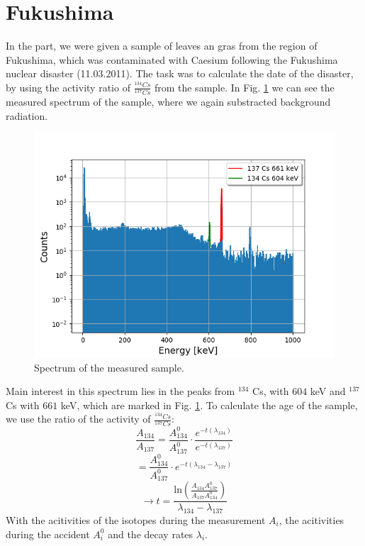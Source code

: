  \section{Fukushima}

In the part, we were given a sample of leaves an gras from the region of Fukushima, which was contaminated with Caesium following the Fukushima nuclear disaster (11.03.2011).
The task was to calculate the date of the disaster, by using the activity ratio of $\frac{^{134}Cs}{^{137}Cs}$ from the sample.
In Fig. \ref{fukushima_spectrum} we can see the measured spectrum of the sample, where we again substracted background radiation.
\begin{figure}[h]
  \includegraphics[width=\linewidth]{../Plots/fukushima_spektrum.png}
  \caption{Spectrum of the measured sample.}
  \label{fukushima_spectrum}
\end{figure}
Main interest in this spectrum lies in the peaks from $^{134}$ Cs, with $604$ keV and $^{137}$Cs with $661$ keV, which are marked in Fig. \ref{fukushima_spectrum}.
To calculate the age of the sample, we use the ratio of the activity of $\frac{^{134}Cs}{^{137}Cs}$:
\[
\frac{A_{134}}{A_{137}} = \frac{A_{134}^0}{A_{137}^0} \cdot \frac{e^{-t(\lambda_{134})}}{e^{-t(\lambda_{137})}}
\]
\[
= \frac{A_{134}^0}{A_{137}^0} \cdot e^{-t (\lambda_{134} - \lambda_{137})}
\]
\begin{equation}
\rightarrow t = \frac{ \text{ln} \left(\frac{A_{134} A_{137}^0}{A_{137} A_{134}^0}\right)}{\lambda_{134} - \lambda_{137}}
\label{time}
\end{equation}
With the acitivities of the isotopes during the measurement $A_i$, the acitivities during the accident $A_{i}^0$ and the decay rates $\lambda _i$.

